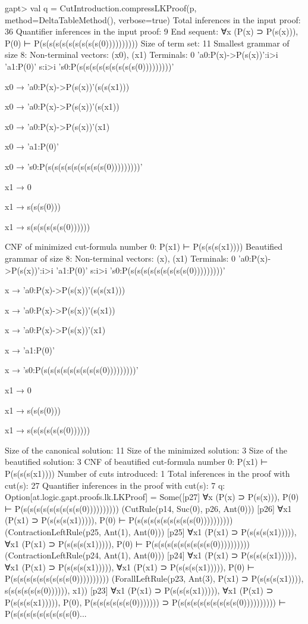 \documentclass[a4paper,11pt]{article}
\begin{document}
\begin{clilisting}
gapt> val q = CutIntroduction.compressLKProof(p, method=DeltaTableMethod(), verbose=true)
Total inferences in the input proof: 36
Quantifier inferences in the input proof: 9
End sequent: ∀x (P(x) ⊃ P(s(x))), P(0) ⊢ P(s(s(s(s(s(s(s(s(s(0))))))))))
Size of term set: 11
Smallest grammar of size 8:
Non-terminal vectors: (x0), (x1)
Terminals:
  0
  'a0:P(x)->P(s(x))':i>i
  'a1:P(0)'
  s:i>i
  's0:P(s(s(s(s(s(s(s(s(s(0)))))))))'

x0 → 'a0:P(x)->P(s(x))'(s(s(x1)))

x0 → 'a0:P(x)->P(s(x))'(s(x1))

x0 → 'a0:P(x)->P(s(x))'(x1)

x0 → 'a1:P(0)'

x0 → 's0:P(s(s(s(s(s(s(s(s(s(0)))))))))'

x1 → 0

x1 → s(s(s(0)))

x1 → s(s(s(s(s(s(0))))))

CNF of minimized cut-formula number 0:
  P(x1) ⊢ P(s(s(s(x1))))
Beautified grammar of size 8:
Non-terminal vectors: (x), (x1)
Terminals:
  0
  'a0:P(x)->P(s(x))':i>i
  'a1:P(0)'
  s:i>i
  's0:P(s(s(s(s(s(s(s(s(s(0)))))))))'

x → 'a0:P(x)->P(s(x))'(s(s(x1)))

x → 'a0:P(x)->P(s(x))'(s(x1))

x → 'a0:P(x)->P(s(x))'(x1)

x → 'a1:P(0)'

x → 's0:P(s(s(s(s(s(s(s(s(s(0)))))))))'

x1 → 0

x1 → s(s(s(0)))

x1 → s(s(s(s(s(s(0))))))

Size of the canonical solution: 11
Size of the minimized solution: 3
Size of the beautified solution: 3
CNF of beautified cut-formula number 0:
  P(x1) ⊢ P(s(s(s(x1))))
Number of cuts introduced: 1
Total inferences in the proof with cut(s): 27
Quantifier inferences in the proof with cut(s): 7
q: Option[at.logic.gapt.proofs.lk.LKProof] =
Some([p27] ∀x (P(x) ⊃ P(s(x))), P(0) ⊢ P(s(s(s(s(s(s(s(s(s(0))))))))))    (CutRule(p14, Suc(0), p26, Ant(0)))
[p26] ∀x1 (P(x1) ⊃ P(s(s(s(x1))))), P(0) ⊢ P(s(s(s(s(s(s(s(s(s(0))))))))))    (ContractionLeftRule(p25, Ant(1), Ant(0)))
[p25] ∀x1 (P(x1) ⊃ P(s(s(s(x1))))),
∀x1 (P(x1) ⊃ P(s(s(s(x1))))),
P(0)
⊢
P(s(s(s(s(s(s(s(s(s(0))))))))))    (ContractionLeftRule(p24, Ant(1), Ant(0)))
[p24] ∀x1 (P(x1) ⊃ P(s(s(s(x1))))),
∀x1 (P(x1) ⊃ P(s(s(s(x1))))),
∀x1 (P(x1) ⊃ P(s(s(s(x1))))),
P(0)
⊢
P(s(s(s(s(s(s(s(s(s(0))))))))))    (ForallLeftRule(p23, Ant(3), P(x1) ⊃ P(s(s(s(x1)))), s(s(s(s(s(s(0)))))), x1))
[p23] ∀x1 (P(x1) ⊃ P(s(s(s(x1))))),
∀x1 (P(x1) ⊃ P(s(s(s(x1))))),
P(0),
P(s(s(s(s(s(s(0))))))) ⊃ P(s(s(s(s(s(s(s(s(s(0))))))))))
⊢
P(s(s(s(s(s(s(s(s(s(0)...
\end{clilisting}
\end{document}

